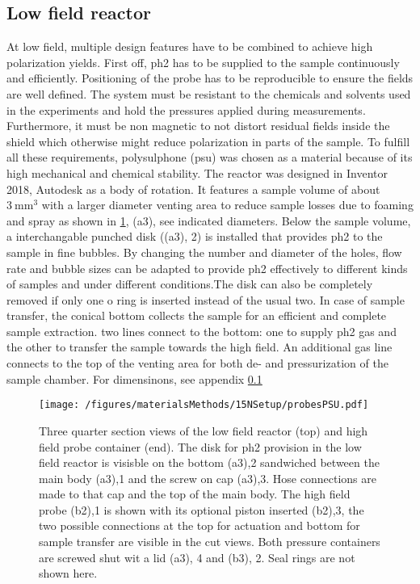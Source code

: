        \subsection{Low field reactor}
        At low field, multiple design features have to be combined to achieve high polarization yields.  First off, ph2 has to be supplied to the sample continuously and efficiently. Positioning of the probe has to be reproducible to ensure the fields are well defined.  The system must be resistant to the chemicals and solvents used in the experiments and hold the pressures applied during measurements.  Furthermore, it must be non magnetic to not distort residual fields inside the shield which otherwise might reduce polarization in parts of the sample. To fulfill all these requirements, polysulphone (psu) was chosen as a material because of its high mechanical and chemical stability.  The reactor was designed in Inventor 2018, Autodesk as a body of rotation. It features a sample volume of about $\SI{3}{\mm\cubed}$ with a larger diameter venting area to reduce sample losses due to foaming and spray as shown in \ref{figure:materialsMethods:probesPSU}, (a3), see indicated diameters. Below the sample volume, a interchangable punched disk ((a3), 2) is installed that provides ph2 to the sample in fine bubbles. By changing the number and diameter of the holes, flow rate and bubble sizes can be adapted to provide ph2 effectively to different kinds of samples and under different conditions.The disk can also be completely removed if only one o ring is inserted instead of the usual two. In case of sample transfer, the conical bottom collects the sample for an efficient and complete sample extraction.  two lines connect to the bottom: one to supply ph2 gas and the other to transfer the sample towards the high field.  An additional gas line connects to the top of the venting area for both de- and pressurization of the sample chamber.
        For dimensinons, see appendix \ref{}
            \begin{figure}
                \centering
                \texttt{[image: /figures/materialsMethods/15NSetup/probesPSU.pdf]}
                \caption[Reactor gemometry]{Three quarter section views of the low field reactor (top) and high field probe container (end). The disk for ph2 provision in the low field reactor is visisble on the bottom (a3),2 sandwiched between the main body (a3),1 and the screw on cap (a3),3.  Hose connections are made to that cap and the top of the main body. The high field probe (b2),1 is shown with its optional piston inserted (b2),3, the two possible connections at the top for actuation and bottom for sample transfer are visible in the cut views. Both pressure containers are screwed shut wit a lid (a3), 4 and (b3), 2. Seal rings are not shown here.}
                \label{figure:materialsMethods:probesPSU}
            \end{figure}
